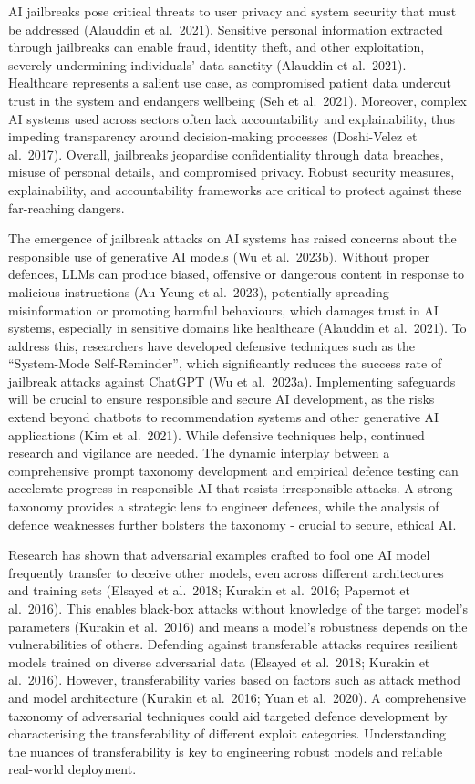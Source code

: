 \documentclass[
  letterpaper,
  DIV=11,
  numbers=noendperiod]{scrartcl}
\begin{document}
AI jailbreaks pose critical threats to user privacy and system security
that must be addressed (Alauddin et al.~2021). Sensitive personal
information extracted through jailbreaks can enable fraud, identity
theft, and other exploitation, severely undermining individuals' data
sanctity (Alauddin et al.~2021). Healthcare represents a salient use
case, as compromised patient data undercut trust in the system and
endangers wellbeing (Seh et al.~2021). Moreover, complex AI systems used
across sectors often lack accountability and explainability, thus
impeding transparency around decision-making processes (Doshi-Velez et
al.~2017). Overall, jailbreaks jeopardise confidentiality through data
breaches, misuse of personal details, and compromised privacy. Robust
security measures, explainability, and accountability frameworks are
critical to protect against these far-reaching dangers.

The emergence of jailbreak attacks on AI systems has raised concerns
about the responsible use of generative AI models (Wu et al.~2023b).
Without proper defences, LLMs can produce biased, offensive or dangerous
content in response to malicious instructions (Au Yeung et al.~2023),
potentially spreading misinformation or promoting harmful behaviours,
which damages trust in AI systems, especially in sensitive domains like
healthcare (Alauddin et al.~2021). To address this, researchers have
developed defensive techniques such as the ``System-Mode
Self-Reminder'', which significantly reduces the success rate of
jailbreak attacks against ChatGPT (Wu et al.~2023a). Implementing
safeguards will be crucial to ensure responsible and secure AI
development, as the risks extend beyond chatbots to recommendation
systems and other generative AI applications (Kim et al.~2021). While
defensive techniques help, continued research and vigilance are needed.
The dynamic interplay between a comprehensive prompt taxonomy
development and empirical defence testing can accelerate progress in
responsible AI that resists irresponsible attacks. A strong taxonomy
provides a strategic lens to engineer defences, while the analysis of
defence weaknesses further bolsters the taxonomy - crucial to secure,
ethical AI.

Research has shown that adversarial examples crafted to fool one AI
model frequently transfer to deceive other models, even across different
architectures and training sets (Elsayed et al.~2018; Kurakin et
al.~2016; Papernot et al.~2016). This enables black-box attacks without
knowledge of the target model's parameters (Kurakin et al.~2016) and
means a model's robustness depends on the vulnerabilities of others.
Defending against transferable attacks requires resilient models trained
on diverse adversarial data (Elsayed et al.~2018; Kurakin et al.~2016).
However, transferability varies based on factors such as attack method
and model architecture (Kurakin et al.~2016; Yuan et al.~2020). A
comprehensive taxonomy of adversarial techniques could aid targeted
defence development by characterising the transferability of different
exploit categories. Understanding the nuances of transferability is key
to engineering robust models and reliable real-world deployment.
\end{document}
